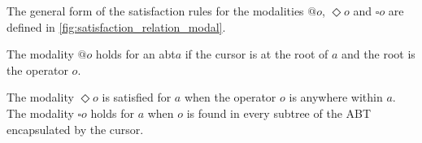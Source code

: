 \documentclass[sigplan,review]{acmart}
\newcommand{\abt}{\textsf{abt}\xspace}
\begin{document}

The general form of the satisfaction rules for the modalities $@o$,
$\Diamond o$ and $\square o$ are defined in
\cref{fig:satisfaction_relation_modal}.

The modality $@o$ holds for an \abt $a$ if the cursor is at the root of
$a$ and the root is the operator $o$. 

The modality $\Diamond o$ is satisfied for $a$ when the operator $o$ is
anywhere within $a$. The modality
$\square o$ holds for $a$ when $o$ is found in every subtree of the
ABT encapsulated by the cursor. 
\end{document}
